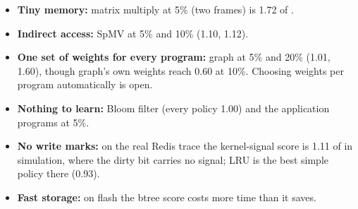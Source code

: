 \begin{itemize}
\item \textbf{Tiny memory:} matrix multiply at 5\% (two frames) is 1.72 of \clock.
\item \textbf{Indirect access:} SpMV at 5\% and 10\% (1.10, 1.12).
\item \textbf{One set of weights for every program:} graph at 5\% and 20\% (1.01, 1.60),
  though graph's own weights reach 0.60 at 10\%. Choosing weights per program
  automatically is open.
\item \textbf{Nothing to learn:} Bloom filter (every policy 1.00) and the application
  programs at 5\%.
\item \textbf{No write marks:} on the real Redis trace the kernel-signal score is 1.11 of
  \clock in simulation, where the dirty bit carries no signal; LRU is the best simple
  policy there (0.93).
\item \textbf{Fast storage:} on flash the btree score costs more time than it saves.
\end{itemize}

